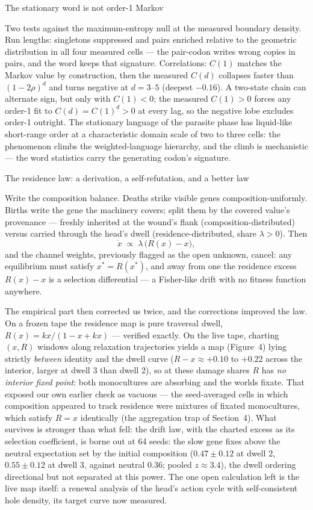 \secc The stationary word is not order-1 Markov

Two tests against the maximum-entropy null at the measured
boundary density. Run lengths: singletons suppressed and pairs
enriched relative to the geometric distribution in all four
measured cells --- the pair-codon writes wrong copies in pairs,
and the word keeps that signature. Correlations: $C(1)$ matches
the Markov value by construction, then the measured $C(d)$
collapses faster than $(1-2\rho)^d$ and turns negative at
$d=3$--$5$ (deepest $-0.16$). A two-state chain can alternate
sign, but only with $C(1)<0$; the measured $C(1)>0$ forces any
order-1 fit to $C(d)=C(1)^d>0$ at every lag, so the negative lobe
excludes order-1 outright. The stationary
language of the parasite phase has liquid-like short-range order
at a characteristic domain scale of two to three cells: the phenomenon climbs the weighted-language hierarchy, and the
climb is mechanistic --- the word statistics carry the generating
codon's signature.

\secc The residence law: a derivation, a self-refutation, and a better law

Write the composition balance. Deaths strike visible genes
composition-uniformly. Births write the gene the machinery covers;
split them by the covered value's provenance --- freshly inherited
at the wound's flank (composition-distributed) versus carried
through the head's dwell (residence-distributed, share
$\lambda>0$). Then
$$
\dot x \;\propto\; \lambda\,\bigl(R(x)-x\bigr),
$$
and the channel weights, previously flagged as the open unknown,
cancel: any equilibrium must satisfy $x^*=R(x^*)$, and away from
one the residence excess $R(x)-x$ is a selection differential ---
a Fisher-like drift with no fitness function anywhere.

The empirical part then corrected us twice, and the corrections
improved the law. On a frozen tape the residence map is pure
traversal dwell, $R(x)=kx/(1-x+kx)$ --- verified exactly. On the
live tape, charting $(x,R)$ windows along relaxation trajectories
yields a map (Figure~4) lying strictly {\it between} identity
and the dwell curve ($R-x\approx+0.10$ to $+0.22$ across the interior, larger
at dwell 3 than dwell 2), so at these damage shares $R$ has {\it
no interior fixed point}: both monocultures are absorbing and the
worlds fixate. That exposed our own earlier check as vacuous ---
the seed-averaged cells in which composition appeared to track
residence were mixtures of fixated monocultures, which satisfy
$R=x$ identically (the aggregation trap of Section~4). What
survives is stronger than what fell: the drift law, with the
charted excess as its selection coefficient, is borne out at 64 seeds: the slow gene
fixes above the neutral expectation set by the initial composition
($0.47\pm0.12$ at dwell 2, $0.55\pm0.12$ at dwell 3, against
neutral 0.36; pooled $z\approx3.4$), the dwell ordering
directional but not separated at this power. The one open
calculation left is the live map itself: a renewal analysis of the
head's action cycle with self-consistent hole density, its target
curve now measured.

